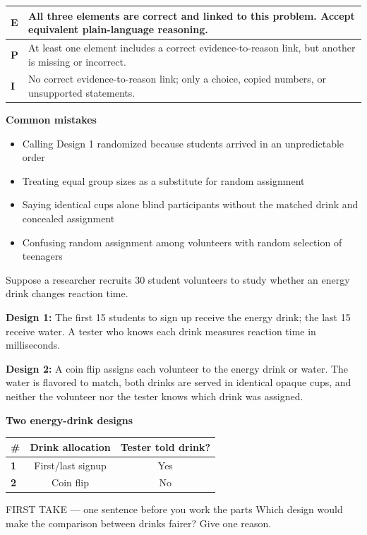 \documentclass[11pt]{article}
\begin{document}
{\small\renewcommand{\arraystretch}{1.25}
\noindent\begin{tabular}{|p{0.5in}|p{5.9in}|}
\hline
\textbf{E} & All three elements are correct and linked to this problem. Accept equivalent plain-language reasoning. \\ \hline
\textbf{P} & At least one element includes a correct evidence-to-reason link, but another is missing or incorrect. \\ \hline
\textbf{I} & No correct evidence-to-reason link; only a choice, copied numbers, or unsupported statements. \\ \hline
\end{tabular}}

\textbf{Common mistakes}
\begin{itemize}[leftmargin=1.5em,itemsep=2pt,topsep=2pt]
  \item Calling Design 1 randomized because students arrived in an unpredictable order
  \item Treating equal group sizes as a substitute for random assignment
  \item Saying identical cups alone blind participants without the matched drink and concealed assignment
  \item Confusing random assignment among volunteers with random selection of teenagers
\end{itemize}

\clearpage
{}

Suppose a researcher recruits 30 student volunteers to study whether an energy drink changes reaction time.\par\smallskip \textbf{Design 1:} The first 15 students to sign up receive the energy drink; the last 15 receive water. A tester who knows each drink measures reaction time in milliseconds.\par \textbf{Design 2:} A coin flip assigns each volunteer to the energy drink or water. The water is flavored to match, both drinks are served in identical opaque cups, and neither the volunteer nor the tester knows which drink was assigned.\par
\begin{center}
\textbf{Two energy-drink designs}\par\smallskip
\begin{tabular}{|l|c|c|}
\hline
\textbf{\#} & \textbf{Drink allocation} & \textbf{Tester told drink?} \\ \hline
\textbf{1} & First/last signup & Yes \\ \hline
\textbf{2} & Coin flip & No \\ \hline
\end{tabular}
\end{center}
\begin{firsttakebox}{FIRST TAKE --- one sentence before you work the parts}
Which design would make the comparison between drinks fairer? Give one reason.\par
{}
\end{firsttakebox}
\end{document}
